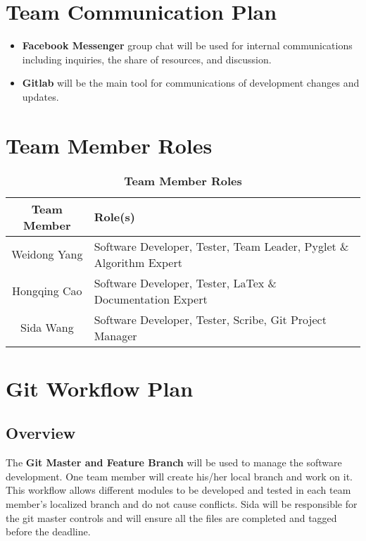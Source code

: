 \documentclass{article}
\begin{document}
\section{Team Communication Plan}
\begin{itemize}
	\item \textbf{Facebook Messenger} group chat will be used for internal communications including inquiries, the share of resources, and discussion.
	\item \textbf{Gitlab} will be the main tool for communications of development changes and updates.
\end{itemize}


\section{Team Member Roles}
\FloatBarrier
\begin{table}[hbt!]
\centering
\begin{tabular}{ |c|l| } \hline
\textbf{Team Member} & \textbf{Role(s)}\\\hline
Weidong Yang & Software Developer, Tester, Team Leader, Pyglet \& Algorithm Expert\\\hline
Hongqing Cao & Software Developer, Tester, LaTex \& Documentation Expert\\\hline
Sida Wang & Software Developer, Tester, Scribe, Git Project Manager\\\hline
\end{tabular}
\caption{\textbf{Team Member Roles}}
\end{table}
\FloatBarrier

\section{Git Workflow Plan}
\subsection{Overview}
The \textbf{Git Master and Feature Branch} will be used to manage the software development. One team member will create his/her local branch and work on it. This workflow allows different modules to be developed and tested in each team member's localized branch and do not cause conflicts. Sida will be responsible for the git master controls and will ensure all the files are completed and tagged before the deadline.
\end{document}
